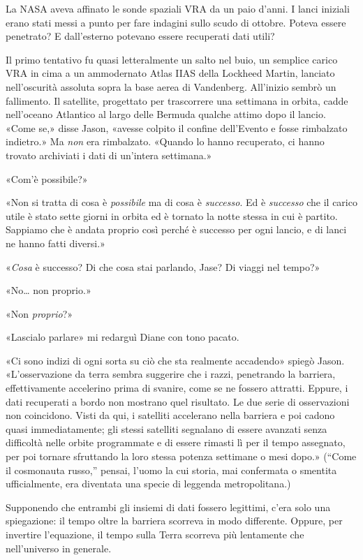 La NASA aveva affinato le sonde spaziali VRA da un paio d'anni. I lanci
iniziali erano stati messi a punto per fare indagini sullo scudo di
ottobre. Poteva essere penetrato? E dall'esterno potevano essere
recuperati dati utili?

Il primo tentativo fu quasi letteralmente un salto nel buio, un semplice
carico VRA in cima a un ammodernato Atlas IIAS della Lockheed Martin,
lanciato nell'oscurità assoluta sopra la base aerea di Vandenberg.
All'inizio sembrò un fallimento. Il satellite, progettato per
trascorrere una settimana in orbita, cadde nell'oceano Atlantico al
largo delle Bermuda qualche attimo dopo il lancio. «Come se,» disse
Jason, «avesse colpito il confine dell'Evento e fosse rimbalzato
indietro.» Ma \emph{non} era rimbalzato. «Quando lo hanno recuperato, ci
hanno trovato archiviati i dati di un'intera settimana.»

«Com'è possibile?»

«Non si tratta di cosa è \emph{possibile} ma di cosa è \emph{successo}.
Ed è \emph{successo} che il carico utile è stato sette giorni in orbita
ed è tornato la notte stessa in cui è partito. Sappiamo che è andata
proprio così perché è successo per ogni lancio, e di lanci ne hanno
fatti diversi.»

«\emph{Cosa} è successo? Di che cosa stai parlando, Jase? Di viaggi nel
tempo?»

«No\ldots{} non proprio.»

«Non \emph{proprio}?»

«Lascialo parlare» mi redarguì Diane con tono pacato.

«Ci sono indizi di ogni sorta su ciò che sta realmente accadendo» spiegò
Jason. «L'osservazione da terra sembra suggerire che i razzi, penetrando
la barriera, effettivamente accelerino prima di svanire, come se ne
fossero attratti. Eppure, i dati recuperati a bordo non mostrano quel
risultato. Le due serie di osservazioni non coincidono. Visti da qui, i
satelliti accelerano nella barriera e poi cadono quasi immediatamente;
gli stessi satelliti segnalano di essere avanzati senza difficoltà nelle
orbite programmate e di essere rimasti lì per il tempo assegnato, per
poi tornare sfruttando la loro stessa potenza settimane o mesi dopo.»
(``Come il cosmonauta russo,'' pensai, l'uomo la cui storia, mai
confermata o smentita ufficialmente, era diventata una specie di
leggenda metropolitana.)

Supponendo che entrambi gli insiemi di dati fossero legittimi, c'era
solo una spiegazione: il tempo oltre la barriera scorreva in modo
differente. Oppure, per invertire l'equazione, il tempo sulla Terra
scorreva più lentamente che nell'universo in generale.

